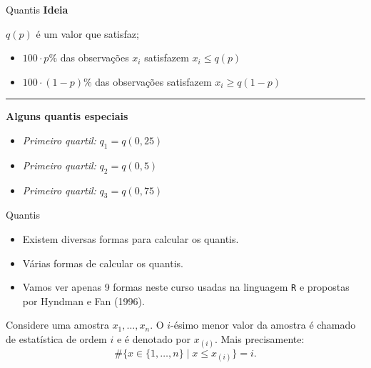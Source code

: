 \documentclass[
  10pt,
  ignorenonframetext,
]{beamer}
\providecommand{\tightlist}{%
  \setlength{\itemsep}{0pt}\setlength{\parskip}{0pt}}\usepackage{longtable,booktabs,array}
\newcommand*{\regrafina}{\rule{\textwidth}{0.5pt}}
\begin{document}
\begin{frame}{Quantis}
\protect\hypertarget{quantis}{}
\textbf{Ideia}

\(q(p)\) é um valor que satisfaz;

\begin{itemize}
\tightlist
\item
  \(100 \cdot p\%\) das observações \(x_i\) satisfazem \(x_i \leq q(p)\)
\item
  \(100 \cdot (1-p)\%\) das observações satisfazem \(x_i \geq q(1-p)\)
\end{itemize}

\regrafina

\textbf{Alguns quantis especiais}

\begin{itemize}
\tightlist
\item
  \emph{Primeiro quartil:} \(q_1 = q(0,25)\)
\item
  \emph{Primeiro quartil:} \(q_2 = q(0,5)\)
\item
  \emph{Primeiro quartil:} \(q_3 = q(0,75)\)
\end{itemize}
\end{frame}

\begin{frame}[fragile]{Quantis}
\protect\hypertarget{quantis-1}{}
\begin{itemize}
\tightlist
\item
  Existem diversas formas para calcular os quantis.
\item
  Várias formas de calcular os quantis.
\item
  Vamos ver apenas 9 formas neste curso usadas na linguagem \texttt{R} e
  propostas por Hyndman e Fan (1996).
\end{itemize}

Considere uma amostra \(x_1,\dots, x_n\). O \(i\)-ésimo menor valor da
amostra é chamado de estatística de ordem \(i\) e é denotado por
\(x_{(i)}\). Mais precisamente: \[
\#\{x \in\{1, \dots, n\} \mid x \leq x_{(i)} \}=i.
\]
\end{frame}
\end{document}
